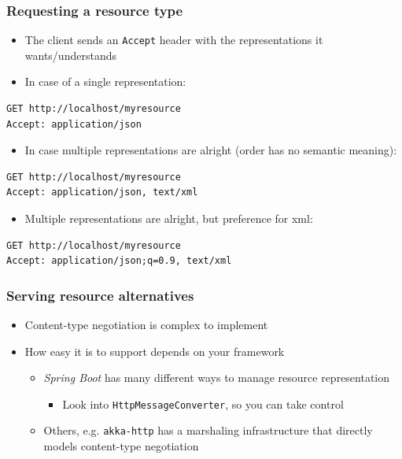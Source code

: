 \documentclass[8pt]{article}
\begin{document}
\subsubsection{Requesting a resource type}
\label{sec:orgca860af}
\begin{itemize}
\item The client sends an \texttt{Accept} header with the representations it wants/understands
\item In case of a single representation:
\end{itemize}
\begin{verbatim}
GET http://localhost/myresource
Accept: application/json
\end{verbatim}
\begin{itemize}
\item In case multiple representations are alright (order has no semantic meaning):
\end{itemize}
\begin{verbatim}
GET http://localhost/myresource
Accept: application/json, text/xml
\end{verbatim}
\begin{itemize}
\item Multiple representations are alright, but preference for xml:
\end{itemize}
\begin{verbatim}
GET http://localhost/myresource
Accept: application/json;q=0.9, text/xml
\end{verbatim}
\subsubsection{Serving resource alternatives}
\label{sec:org6b5c064}
\begin{itemize}
\item Content-type negotiation is complex to implement
\item How easy it is to support depends on your framework
\begin{itemize}
\item \emph{Spring Boot} has many different ways to manage resource representation
\begin{itemize}
\item Look into \texttt{HttpMessageConverter}, so you can take control
\end{itemize}
\item Others, e.g. \texttt{akka-http} has a marshaling infrastructure that directly models content-type negotiation
\end{itemize}
\end{itemize}
\end{document}
